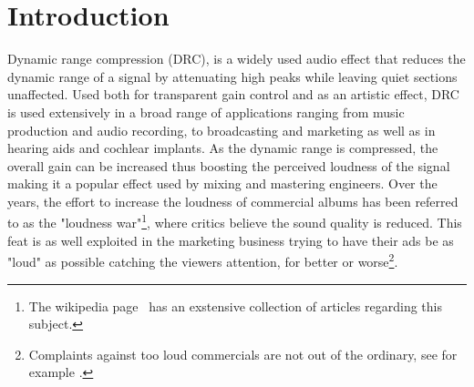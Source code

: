 \documentclass[../main2.tex]{subfiles}
\begin{document}
\section{Introduction}
Dynamic range compression (DRC), is a widely used audio effect that reduces the dynamic range of a signal by attenuating high peaks while leaving quiet sections unaffected. Used both for transparent gain control and as an artistic effect, DRC is used extensively in a broad range of applications ranging from music production and audio recording, to broadcasting and marketing as well as in hearing aids and cochlear implants. As the dynamic range is compressed, the overall gain can be increased thus boosting the perceived loudness of the signal making it a popular effect used by mixing and mastering engineers. Over the years, the effort to increase the loudness  of commercial albums has been referred to as the "loudness war"\footnote{The wikipedia page~\cite{loudness_war} has an exstensive collection of articles regarding this subject.}, where critics believe the sound quality is reduced. This feat is as well exploited in the marketing business trying to have their ads be as "loud" as possible catching the viewers attention, for better or worse\footnote{Complaints against too loud commercials are not out of the ordinary, see for example \cite{comp_ads}.}. 
\end{document}
